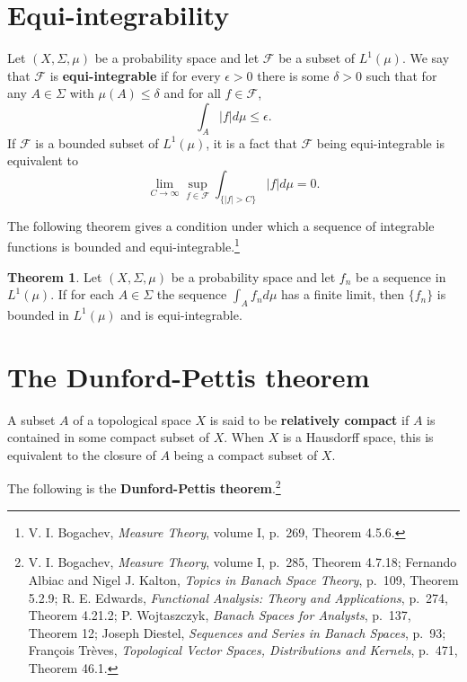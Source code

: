 \documentclass{article}
\theoremstyle{definition}
\newtheorem{theorem}{Theorem}
\theoremstyle{definition}
\begin{document}
\section{Equi-integrability}
Let $(X,\Sigma,\mu)$ be a probability space and let $\mathscr{F}$ be a subset of $L^1(\mu)$. We say that $\mathscr{F}$
is \textbf{equi-integrable} if for every $\epsilon>0$ there is some $\delta>0$ such that for any
$A \in \Sigma$ with $\mu(A) \leq \delta$ and for all $f \in \mathscr{F}$,
\[
\int_A |f| d\mu \leq \epsilon.
\]
If $\mathscr{F}$ is a bounded subset of $L^1(\mu)$, it is a fact that $\mathscr{F}$ being equi-integrable is equivalent to 
\begin{equation}
\lim_{C \to \infty} \sup_{f \in \mathscr{F}} \int_{\{|f|>C\}} |f| d\mu  = 0.
\label{Climit}
\end{equation}

The following theorem gives a condition under which a sequence of integrable functions is bounded and
equi-integrable.\footnote{V. I. Bogachev, {\em Measure Theory}, volume I, p.~269, Theorem 4.5.6.}

\begin{theorem}
Let $(X,\Sigma,\mu)$ be a probability space and let $f_n$ be a sequence in $L^1(\mu)$. If for each $A \in \Sigma$ the
sequence $\int_A f_n d\mu$ has a finite limit, then $\{f_n\}$ is bounded in $L^1(\mu)$ and is equi-integrable.
\label{Alimit}
\end{theorem}


\section{The Dunford-Pettis theorem}
A subset $A$ of a topological space $X$ is said to be \textbf{relatively compact} if $A$ is contained in some compact subset of $X$. When $X$ is a Hausdorff
space, this is equivalent to the closure of $A$ being a compact subset of $X$. 


The following is the \textbf{Dunford-Pettis theorem}.\footnote{V. I. Bogachev, {\em Measure Theory}, volume I,
p.~285, Theorem 4.7.18; Fernando Albiac and
Nigel J. Kalton, {\em Topics in Banach Space Theory}, p.~109, Theorem 5.2.9;
R. E. Edwards, {\em Functional Analysis: Theory and Applications}, p.~274, Theorem 4.21.2;
P. Wojtaszczyk, {\em Banach Spaces for Analysts},
p.~137, Theorem 12; Joseph Diestel, {\em Sequences and Series in Banach Spaces}, p.~93; Fran\c{c}ois Tr\`eves, {\em Topological Vector Spaces, Distributions and Kernels}, p.~471, Theorem 46.1.}
\end{document}
